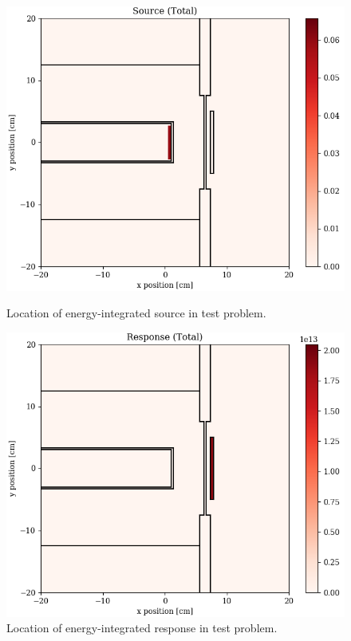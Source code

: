 \begin{figure}
  \centering
  \begin{minipage}{0.49\linewidth}
    \centering
    \includegraphics[width=\linewidth]{content/testprob/source_total.png}
    \caption{Location of energy-integrated source in test problem.}
    \label{fig:tp:source_total}
  \end{minipage}
  \hfill
  \begin{minipage}{0.49\linewidth}
    \centering
    \includegraphics[width=\linewidth]{content/testprob/response_total.png}
    \caption{Location of energy-integrated response in test problem.}
    \label{fig:tp:response_total}
  \end{minipage}
\end{figure}
